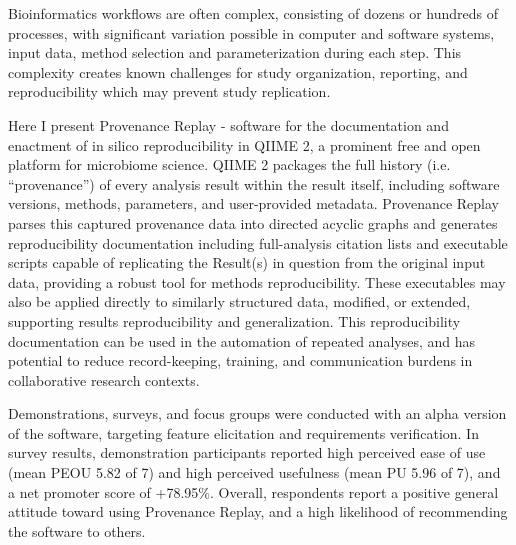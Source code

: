 Bioinformatics workflows are often complex, consisting of dozens or hundreds of
processes, with significant variation possible in computer and software systems,
input data, method selection and parameterization during each step. This
complexity creates known challenges for study organization, reporting, and
reproducibility which may prevent study replication.

Here I present Provenance Replay - software for the documentation and enactment
of in silico reproducibility in QIIME 2, a prominent free and open platform for
microbiome science. QIIME 2 packages the full history (i.e. “provenance”) of
every analysis result within the result itself, including software versions,
methods, parameters, and user-provided metadata. Provenance Replay parses this
captured provenance data into directed acyclic graphs and generates
reproducibility documentation including full-analysis citation lists and
executable scripts capable of replicating the Result(s) in question from the
original input data, providing a robust tool for methods reproducibility. These
executables may also be applied directly to similarly structured data, modified,
or extended, supporting results reproducibility and generalization. This
reproducibility documentation can be used in the automation of repeated
analyses, and has potential to reduce record-keeping, training, and
communication burdens in collaborative research contexts.

Demonstrations, surveys, and focus groups were conducted with an alpha version
of the software, targeting feature elicitation and requirements verification.
In survey results, demonstration participants reported high perceived ease of
use (mean PEOU 5.82 of 7) and high perceived usefulness (mean PU 5.96 of 7), and
a net promoter score of +78.95\%. Overall, respondents report a positive general
attitude toward using Provenance Replay, and a high likelihood of recommending
the software to others.
